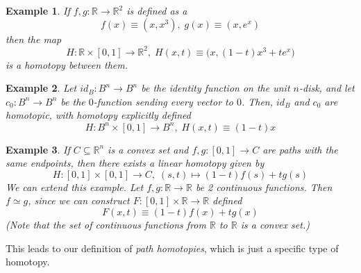 \documentclass{article}
\newtheorem{example}{Example}[section]
\theoremstyle{remark}
\theoremstyle{definition}
\begin{document}
  \begin{example}
  If $f, g: \mathbb{R} \longrightarrow \mathbb{R}^2$ is defined as a
  \[f(x) \equiv (x, x^3), \; g(x) \equiv (x, e^x)\]
  then the map 
  \[H: \mathbb{R} \times [0,1] \longrightarrow \mathbb{R}^2, \; H(x, t) \equiv \big( x, (1-t) x^3 + t e^x \big) \]
  is a homotopy between them. 
  \end{example}

  \begin{example}
  Let $id_B: B^n \longrightarrow B^n$ be the identity function on the unit $n$-disk, and let $c_0: B^n \longrightarrow B^n$ be the $0$-function sending every vector to $0$. Then, $id_B$ and $c_0$ are homotopic, with homotopy explicitly defined
  \[H: B^n \times [0,1] \longrightarrow B^n, \; H(x, t) \equiv (1-t) x\]
  \end{example}

  \begin{example}
  If $C \subseteq \mathbb{R}^n$ is a convex set and $f, g: [0,1] \longrightarrow C$ are paths with the same endpoints, then there exists a \textit{linear homotopy} given by 
  \[H: [0,1] \times [0,1] \longrightarrow C, \; (s, t) \mapsto (1-t) f(s) + t g(s)\]
  We can extend this example. Let $f, g: \mathbb{R} \longrightarrow \mathbb{R}$ be 2 continuous functions. Then $f \simeq g$, since we can construct $F: [0,1] \times \mathbb{R} \longrightarrow \mathbb{R}$ defined
  \[F(x, t) \equiv (1-t) f(x) + t g(x)\]
  (Note that the set of continuous functions from $\mathbb{R}$ to $\mathbb{R}$ is a convex set.)
  \end{example}
  This leads to our definition of \textit{path homotopies}, which is just a specific type of homotopy. 
\end{document}
